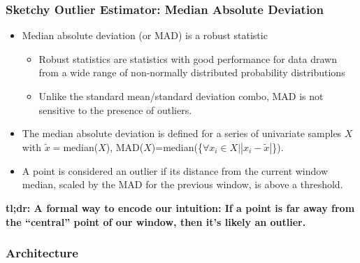 \documentclass[aspectratio=169]{beamer}
\begin{document}
\begin{frame}
\frametitle{Sketchy Outlier Estimator: Median Absolute Deviation}
\begin{itemize}
\item Median absolute deviation (or MAD) is a robust statistic\pause
  \begin{itemize}
  \item Robust statistics are statistics with good performance for data drawn from a wide range of non-normally distributed probability distributions
  \item Unlike the standard mean/standard deviation combo, MAD is not sensitive to the presence of outliers.\pause
  \end{itemize}
\item The median absolute deviation is defined for a series of univariate samples $X$ with $\tilde{x}=$median($X$), MAD($X$)=median(\{$\forall x_i \in X \lvert |x_i - \tilde{x}|$\}).\pause
\item A point is considered an outlier if its distance from the current window median, scaled by the MAD for the previous window, is above a threshold.\pause
\end{itemize}
{\bf tl;dr: A formal way to encode our intuition: If a point is far away from the ``central'' point of our window, then it's likely an outlier. }
\end{frame}


\begin{frame}
\frametitle{Architecture}
\begin{center}
\end{center}
\end{frame}
\end{document}
